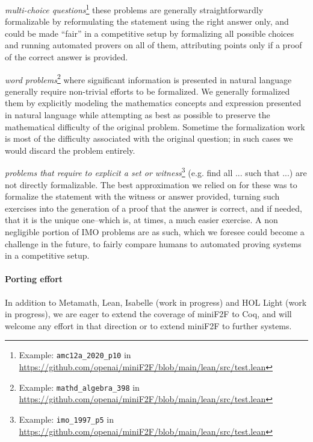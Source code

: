 \begin{description}
    \item \textit{multi-choice questions}\footnote{
        Example: \texttt{amc12a\_2020\_p10} in \url{https://github.com/openai/miniF2F/blob/main/lean/src/test.lean}
    } these problems are generally straightforwardly formalizable by reformulating the statement using the right answer only, and could be made “fair” in a competitive setup by formalizing all possible choices and running automated provers on all of them, attributing points only if a proof of the correct answer is provided.
    \item \textit{word problems}\footnote{
        Example: \texttt{mathd\_algebra\_398} in
        \url{https://github.com/openai/miniF2F/blob/main/lean/src/test.lean}
    } where significant information is presented in natural language generally require non-trivial efforts to be formalized. We generally formalized them by explicitly modeling the mathematics concepts and expression presented in natural language while attempting as best as possible to preserve the mathematical difficulty of the original problem. Sometime the formalization work is most of the difficulty associated with the original question; in such cases we would discard the problem entirely.
    \item \textit{problems that require to explicit a set or witness}\footnote{
        Example: \texttt{imo\_1997\_p5} in
        \url{https://github.com/openai/miniF2F/blob/main/lean/src/test.lean}
    } (e.g. find all ... such that ...) are not directly formalizable. The best approximation we relied on for these was to formalize the statement with the witness or answer provided, turning such exercises into the generation of a proof that the answer is correct, and if needed, that it is the unique one--which is, at times, a much easier exercise. A non negligible portion of IMO problems are as such, which we foresee could become a challenge in the future, to fairly compare humans to automated proving systems in a competitive setup.
\end{description}

\paragraph*{Porting effort} In addition to Metamath, Lean, Isabelle (work in progress) and HOL Light (work in progress), we are eager to extend the coverage of \textsf{miniF2F} to Coq, and will welcome any effort in that direction or to extend \textsf{miniF2F} to further systems.


